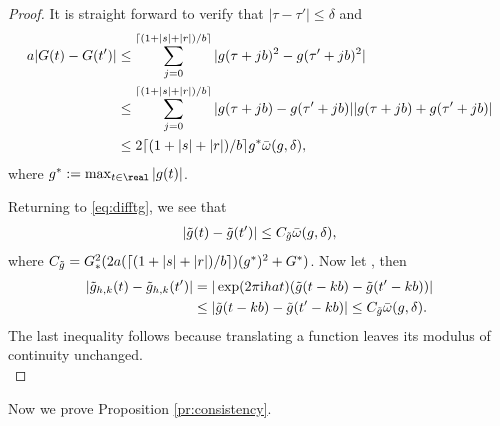 \begin{appendices}
\begin{proof}
   It is straight forward to verify that  $\vert \tau - \tau' \vert \le \delta$ and 
\begin{align}
a  \vert G(t) - G(t') \vert & \le  \sum_{j = 0}^{\lceil ( 1 + \vert s \vert  +\vert r \vert )/b \rceil} \vert g(\tau + j b)^2 - g(\tau' + j b)^2\vert\notag\\
  & \le \sum_{j = 0}^{\lceil (1 + \vert s \vert  +\vert r\vert )/b \rceil} \vert g(\tau + j b) - g(\tau' + j b) \vert \vert g(\tau + j b) + g(\tau' + j b)\vert\notag\\
  & \le 2 \lceil (1 + \vert s \vert  + \vert r \vert)/b\rceil g^*{\bar{\omega}}({g},\delta),
  \label{}
\end{align}
where $g^* := \max_{t \in \real} \vert g(t)\vert $.
\begin{comment}
On the other hand, if $\vert \tau - \tau'\vert > \delta$, then 
\begin{align}
  &a\vert G(t) - G(t') \vert \notag \\
  &\quad \le \vert g(\tau')^2 - g(r)^2\vert +   \vert g(s)^2 - g(\tau + c)^2 \vert\notag \\
  &\qquad +\sum_{j = 1}^{\lceil (s + r)/b \rceil} \{\vert g(\tau + (j-1) b)^2 - g(\tau' + j b)^2\vert\}.  \notag
  \label{}
\end{align}
where $c = \lfloor (\vert s\vert  + \vert r \vert )/b \rfloor b $. It follows as above that 
\begin{align}
\vert G(t) - G(t') \vert \le 2a (\lceil (s + r)/b\rceil +1)g^*\modc{g}{\delta}.
\end{align}
\end{comment}
Returning to \eqref{eq:difftg}, we see that
\begin{align}
  \vert \tilde{g}(t) - \tilde{g}(t')\vert \le C_{\tilde{g}} {\bar{\omega}}({g},\delta),\notag
  \label{}
\end{align}
where $C_{\tilde{g}} = G_*^2(2a (\lceil ( 1 + \vert s \vert  +\vert r\vert)/b\rceil)(g^*)^2 + G^*)$. Now let \hkints, then
\begin{align}
  \vert \tilde{g}_{h,k}(t) - \tilde{g}_{h,k}(t')\vert & = \vert \exp({2 \pi \mathrm{i} h a t}) (\tilde{g}(t - kb) -\tilde{g}(t'-kb)) \vert\notag\\
  &\le \vert \tilde{g}(t - kb) -\tilde{g}(t'-kb) \vert \le C_{\tilde{g}} {\bar{\omega}}({g},\delta).
  \label{}
\end{align}
The last inequality follows because translating a function leaves its modulus of continuity unchanged.\\
\end{proof}
\noindent Now we prove Proposition \eqref{pr:consistency}.\\\\

\end{appendices}
